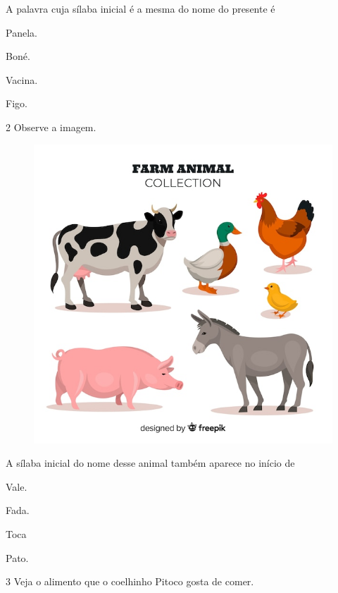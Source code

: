 A palavra cuja sílaba inicial é a mesma do nome do presente é


\begin{multicols}{2}
\begin{escolha}
\item Panela.

\item Boné.

\item Vacina.

\item Figo.
\end{escolha}
\end{multicols}

\num{2} Observe a imagem.

\begin{figure}[htpb!]
\centering
\includegraphics[width=.5\textwidth]{media/image148.jpeg}
\end{figure}


A sílaba inicial do nome desse animal também aparece no início de

\begin{multicols}{2}
\begin{escolha}
\item Vale.

\item Fada.

\item Toca

\item Pato.
\end{escolha}
\end{multicols}

\pagebreak
\num{3} Veja o alimento que o coelhinho Pitoco gosta de comer.

